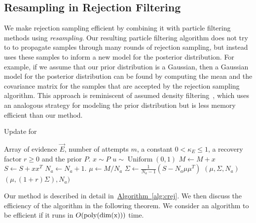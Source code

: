 \documentclass[twoside]{article}
\newcommand{\alg}[1]{\hyperref[alg:#1]{Algorithm~\ref*{alg:#1}}}
\newcommand{\CRej}{\text{rejection filtering}}
\begin{document}
\subsection{Resampling in Rejection Filtering}

We make rejection sampling efficient by combining it with particle
filtering methods using \emph{resampling}.
Our resulting particle filtering algorithm does not try to
to propagate samples through many rounds of rejection sampling, but instead
uses these samples to inform a new model for the posterior distribution. 
For example, if
we assume that our prior distribution is a Gaussian, then a Gaussian model for the posterior
distribution can be found by computing the mean and the covariance matrix for the samples
that are accepted by the rejection sampling algorithm.  This approach is
reminiscent of assumed density filtering~\cite{minka_expectation_2001}, which uses an analogous strategy
for modeling the prior distribution but is less memory efficient than
our method.

\begin{algorithm}[t!]
    \caption{Update for \CRej}
    \label{alg:crej}
    \begin{algorithmic}
        \Require Array of evidence $\vec{E}$, number of attempts $m$, a constant $0<\kappa_E\le 1$, a recovery factor $r \ge 0$ and the prior $P$.
            \State $x \sim P$
            \State $u \sim \operatorname{Uniform}(0, 1)$
            \State $M \gets M+ x$
            \State $S \gets S+ xx^T$
    \State $N_a \gets N_a +1$.
            \EndIf
    \EndFor
       \State $\mu\gets M/N_a $
       \State $\Sigma \gets \frac{1}{N_a -1}\left(S - N_a \mu\mu^T \right)$
    \State\Return $(\mu,\Sigma,N_a)$
   \Else
    \State\Return $(\mu, (1+r)\Sigma),N_a)$

   \EndIf
          
        \EndFunction
    \end{algorithmic}
\end{algorithm}

Our method is described in detail in~\alg{crej}. We then discuss the efficiency of the algorithm in the following theorem.
We consider an algorithm to be efficient if it runs in $O(\rm{poly}({\rm dim}(x)))$ time.
\end{document}

